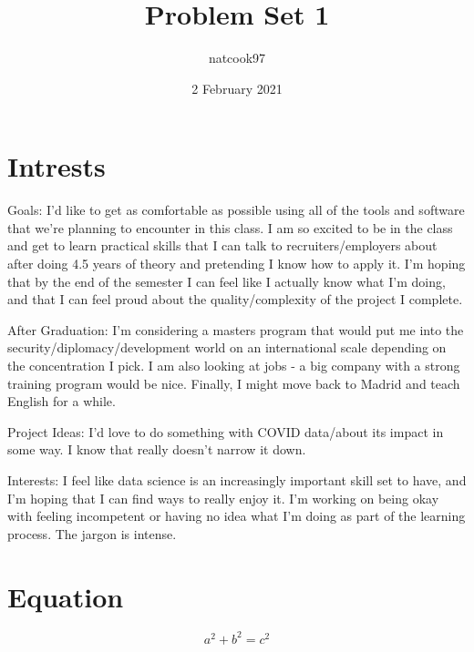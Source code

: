 \documentclass{article}
\title{Problem Set 1}
\author{natcook97 }
\date{2 February 2021}
\begin{document}
\maketitle

\section{Intrests}

Goals: I'd like to get as comfortable as possible using all of the tools and software that we're planning to encounter in this class. I am so excited to be in the class and get to learn practical skills that I can talk to recruiters/employers about after doing 4.5 years of theory and pretending I know how to apply it. I'm hoping that by the end of the semester I can feel like I actually know what I'm doing, and that I can feel proud about the quality/complexity of the project I complete. 

After Graduation:  I'm considering a masters program that would put me into the security/diplomacy/development world on an international scale depending on the concentration I pick. I am also looking at jobs - a big company with a strong training program would be nice. Finally, I might move back to Madrid and teach English for a while.

Project Ideas: I'd love to do something with COVID data/about its impact in some way. I know that really doesn't narrow it down. 

Interests: I feel like data science is an increasingly important skill set to have, and I'm hoping that I can find ways to really enjoy it. I'm working on being okay with feeling incompetent or having no idea what I'm doing as part of the learning process. The jargon is intense. 


\section{Equation}
\[ a^2 + b^2 = c^2 \]
\end{document}
